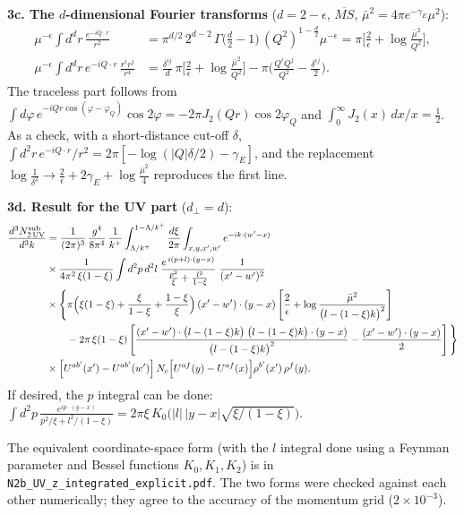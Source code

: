 \documentclass[10pt]{article}
\numberwithin{equation}{section}
\begin{document}
\textbf{3c. The $d$-dimensional Fourier transforms} ($d=2-\epsilon$, $\overline{MS}$, $\bar\mu^{2}=4\pi e^{-\gamma_{E}}\mu^{2}$):
\begin{align}
\mu^{-\epsilon}\!\int d^{d}r\,\frac{e^{-iQ\cdot r}}{r^{2}}&=\pi^{d/2}\,2^{d-2}\,\Gamma\big(\tfrac d2-1\big)\,(Q^{2})^{1-\frac d2}\mu^{-\epsilon}=\pi\Big[\frac{2}{\epsilon}+\log\frac{\bar\mu^{2}}{Q^{2}}\Big],\\
\mu^{-\epsilon}\!\int d^{d}r\,e^{-iQ\cdot r}\,\frac{r^{i}r^{j}}{r^{4}}&=\frac{\delta^{ij}}{d}\,\pi\Big[\frac{2}{\epsilon}+\log\frac{\bar\mu^{2}}{Q^{2}}\Big]-\pi\Big(\frac{Q^{i}Q^{j}}{Q^{2}}-\frac{\delta^{ij}}{2}\Big).
\end{align}
The traceless part follows from $\int d\varphi\,e^{-iQr\cos(\varphi-\varphi_{Q})}\cos2\varphi=-2\pi J_{2}(Qr)\cos2\varphi_{Q}$ and $\int_{0}^{\infty}J_{2}(x)\,dx/x=\frac12$. As a check, with a short-distance cut-off $\delta$, $\int d^{2}r\,e^{-iQ\cdot r}/r^{2}=2\pi[-\log(|Q|\delta/2)-\gamma_{E}]$, and the replacement $\log\frac{1}{\delta^{2}}\to\frac{2}{\epsilon}+2\gamma_{E}+\log\frac{\bar\mu^{2}}{4}$ reproduces the first line.

\textbf{3d. Result for the UV part} ($d_{\perp}=d$):
\begin{align}
\frac{d^{3}N^{\rm sub}_{2\,\rm UV}}{d^{3}k}&=\frac{1}{(2\pi)^{3}}\,\frac{g^{4}}{8\pi^{4}}\,\frac{1}{k^{+}}\int_{\Lambda/k^{+}}^{1-\Lambda/k^{+}}\frac{d\xi}{2\pi}\int_{x,y,x',w'}e^{-ik\cdot(w'-x)}\notag\\&\times\frac{1}{4\pi^{2}\,\xi(1-\xi)}\int d^{2}p\,d^{2}l\;\frac{e^{\,i(p+l)\cdot(y-x)}}{\frac{p^{2}}{\xi}+\frac{l^{2}}{1-\xi}}\;\frac{1}{(x'-w')^{2}}\notag\\
&\times\Bigg\{\pi\Big(\xi(1-\xi)+\frac{\xi}{1-\xi}+\frac{1-\xi}{\xi}\Big)\,(x'-w')\cdot(y-x)\left[\frac{2}{\epsilon}+\log\frac{\bar\mu^{2}}{\big(l-(1-\xi)k\big)^{2}}\right]\notag\\
&\qquad-2\pi\,\xi(1-\xi)\left[\frac{(x'-w')\cdot\big(l-(1-\xi)k\big)\;\big(l-(1-\xi)k\big)\cdot(y-x)}{\big(l-(1-\xi)k\big)^{2}}-\frac{(x'-w')\cdot(y-x)}{2}\right]\Bigg\}\notag\\
&\times\Big[U^{ab'}(x')-U^{ab'}(w')\Big]\,N_{c}\Big[U^{af}(y)-U^{af}(x)\Big]\rho^{b'}(x')\,\rho^{f}(y).
\label{eq:UVmom}
\end{align}
If desired, the $p$ integral can be done: $\int d^{2}p\,\frac{e^{ip\cdot(y-x)}}{p^{2}/\xi+l^{2}/(1-\xi)}=2\pi\xi\,K_{0}\big(|l|\,|y-x|\sqrt{\xi/(1-\xi)}\big)$.

The equivalent coordinate-space form (with the $l$ integral done using a Feynman parameter and Bessel functions $K_{0},K_{1},K_{2}$) is in \texttt{N2b\_UV\_z\_integrated\_explicit.pdf}. The two forms were checked against each other numerically; they agree to the accuracy of the momentum grid ($2\times10^{-3}$).
\end{document}
